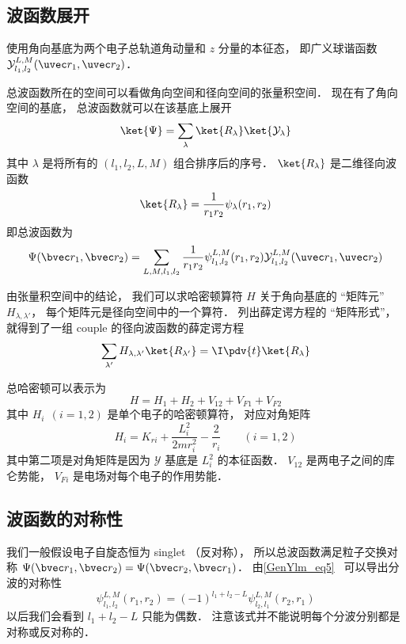\subsection{波函数展开}
使用角向基底为两个电子总轨道角动量和 $z$ 分量的本征态， 即广义球谐函数 $\mathcal{Y}_{l_1,l_2}^{L,M}(\uvec r_1, \uvec r_2)$．

总波函数所在的空间可以看做角向空间和径向空间的张量积空间． 现在有了角向空间的基底， 总波函数就可以在该基底上展开
\begin{equation}
\ket{\Psi} = \sum_\lambda \ket{R_\lambda}\ket{\mathcal{Y_\lambda}}
\end{equation}
其中 $\lambda$ 是将所有的 $(l_1,l_2,L,M)$ 组合排序后的序号． $\ket{R_\lambda}$ 是二维径向波函数
\begin{equation}
\ket{R_\lambda} = \frac{1}{r_1 r_2} \psi_\lambda(r_1, r_2)
\end{equation}
即总波函数为
\begin{equation}\label{HeTDSE_eq2}
\Psi(\bvec r_1, \bvec r_2) = \sum_{L, M, l_1, l_2}  \frac{1}{r_1 r_2} \psi_{l_1, l_2}^{L, M}(r_1, r_2)\mathcal{Y}_{l_1, l_2}^{L, M}(\uvec r_1, \uvec r_2)
\end{equation}

由张量积空间中的结论， 我们可以求哈密顿算符 $H$ 关于角向基底的 “矩阵元” $H_{\lambda, \lambda'}$， 每个矩阵元是径向空间中的一个算符． 列出薛定谔方程的 “矩阵形式”， 就得到了一组 couple 的径向波函数的薛定谔方程
\begin{equation}
\sum_{\lambda'} H_{\lambda, \lambda'} \ket{R_{\lambda'}} = \I \pdv{t} \ket{R_{\lambda}}
\end{equation}

总哈密顿可以表示为
\begin{equation}
H = H_1 + H_2 + V_{12} + V_{F1} + V_{F2}
\end{equation}
其中 $H_i \ \ (i = 1, 2)$ 是单个电子的哈密顿算符， 对应对角矩阵
\begin{equation}
H_i = K_{ri} + \frac{L_i^2}{2m r_i^2} - \frac{2}{r_i} \qquad (i = 1,2)
\end{equation}
其中第二项是对角矩阵是因为 $\mathcal Y$ 基底是 $L_i^2$ 的本征函数． $V_{12}$ 是两电子之间的库仑势能， $V_{Fi}$ 是电场对每个电子的作用势能．

\subsection{波函数的对称性}
我们一般假设电子自旋态恒为 singlet （反对称）， 所以总波函数满足粒子交换对称 $\Psi(\bvec r_1, \bvec r_2) = \Psi(\bvec r_2, \bvec r_1)$． 由\autoref{GenYlm_eq5}~ 可以导出分波的对称性
\begin{equation}\label{HeTDSE_eq1}
\psi_{l_1, l_2}^{L, M}(r_1, r_2) = (-1)^{l_1 + l_2 - L} \psi_{l_2, l_1}^{L, M}(r_2, r_1)
\end{equation}
以后我们会看到 $l_1 + l_2 - L$ 只能为偶数． %
注意该式并不能说明每个分波分别都是对称或反对称的．

